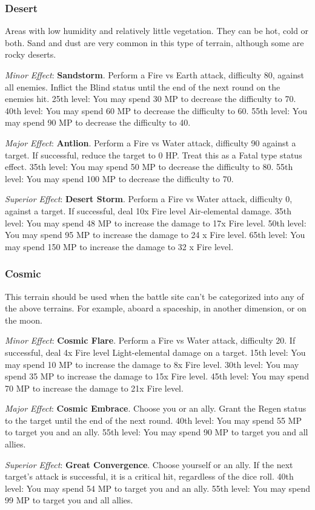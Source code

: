 \begin{multicols}{2}
    \subsubsection{Desert}

    Areas with low humidity and relatively little vegetation. They can be hot, cold or both. Sand and dust are very common in this type of terrain, although some are rocky deserts.

	\textit{Minor Effect}: \textbf{Sandstorm}. Perform a Fire vs Earth attack, difficulty 80, against all enemies. Inflict the Blind status until the end of the next round on the enemies hit. 25th level: You may spend 30 MP to decrease the difficulty to 70. 40th level: You may spend 60 MP to decrease the difficulty to 60. 55th level: You may spend 90 MP to decrease the difficulty to 40.

	\textit{Major Effect}: \textbf{Antlion}. Perform a Fire vs Water attack, difficulty 90 against a target. If successful, reduce the target to 0 HP. Treat this as a Fatal type status effect. 35th level: You may spend 50 MP to decrease the difficulty to 80. 55th level: You may spend 100 MP to decrease the difficulty to 70.

	\textit{Superior Effect}: \textbf{Desert Storm}. Perform a Fire vs Water attack, difficulty 0, against a target. If successful, deal 10x Fire level Air-elemental damage. 35th level: You may spend 48 MP to increase the damage to 17x Fire level. 50th level: You may spend 95 MP to increase the damage to 24 x Fire level. 65th level: You may spend 150 MP to increase the damage to 32 x Fire level.

    \subsubsection{Cosmic}

    This terrain should be used when the battle site can’t be categorized into any of the above terrains. For example, aboard a spaceship, in another dimension, or on the moon.

	\textit{Minor Effect}: \textbf{Cosmic Flare}. Perform a Fire vs Water attack, difficulty 20. If successful, deal 4x Fire level Light-elemental damage on a target. 15th level: You may spend 10 MP to increase the damage to 8x Fire level. 30th level: You may spend 35 MP to increase the damage to 15x Fire level. 45th level: You may spend 70 MP to increase the damage to 21x Fire level.

	\textit{Major Effect}: \textbf{Cosmic Embrace}. Choose you or an ally. Grant the Regen status to the target until the end of the next round. 40th level: You may spend 55 MP to target you and an ally. 55th level: You may spend 90 MP to target you and all allies.

	\textit{Superior Effect}: \textbf{Great Convergence}. Choose yourself or an ally. If the next target’s attack is successful, it is a critical hit, regardless of the dice roll. 40th level: You may spend 54 MP to target you and an ally. 55th level: You may spend 99 MP to target you and all allies.

\end{multicols}
 

